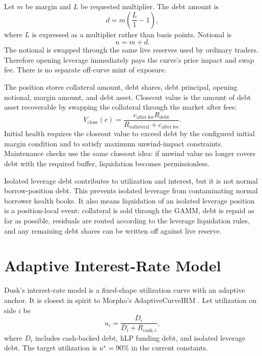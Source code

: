 \documentclass[11pt]{article}
\newcommand{\cash}{\mathrm{cash}}
\newcommand{\debt}{\mathrm{debt}}
\begin{document}
Let $m$ be margin and $L$ be requested multiplier. The debt amount is
\begin{equation}
d=m\left(\frac{L}{1}-1\right),
\end{equation}
where $L$ is expressed as a multiplier rather than basis points. Notional is
\begin{equation}
n=m+d.
\end{equation}
The notional is swapped through the same live reserves used by ordinary traders. Therefore opening leverage immediately pays the curve's price impact and swap fee. There is no separate off-curve mint of exposure.

The position stores collateral amount, debt shares, debt principal, opening notional, margin amount, and debt asset. Closeout value is the amount of debt asset recoverable by swapping the collateral through the market after fees:
\begin{equation}
V_{\mathrm{close}}(c)=\frac{c_{\mathrm{after\ fee}}R_{\debt}}{R_{\mathrm{collateral}}+c_{\mathrm{after\ fee}}}.
\end{equation}
Initial health requires the closeout value to exceed debt by the configured initial margin condition and to satisfy maximum unwind-impact constraints. Maintenance checks use the same closeout idea: if unwind value no longer covers debt with the required buffer, liquidation becomes permissionless.

Isolated leverage debt contributes to utilization and interest, but it is not normal borrow-position debt. This prevents isolated leverage from contaminating normal borrower health books. It also means liquidation of an isolated leverage position is a position-local event: collateral is sold through the GAMM, debt is repaid as far as possible, residuals are routed according to the leverage liquidation rules, and any remaining debt shares can be written off against live reserve.

\section{Adaptive Interest-Rate Model}

Dusk's interest-rate model is a fixed-shape utilization curve with an adaptive anchor. It is closest in spirit to Morpho's AdaptiveCurveIRM \cite{morpho-irm,morpho-irm-github}. Let utilization on side $i$ be
\begin{equation}
u_i=\frac{D_i}{D_i+R_{\cash,i}},
\end{equation}
where $D_i$ includes cash-backed debt, hLP funding debt, and isolated leverage debt. The target utilization is $u^\star=90\%$ in the current constants.
\end{document}

